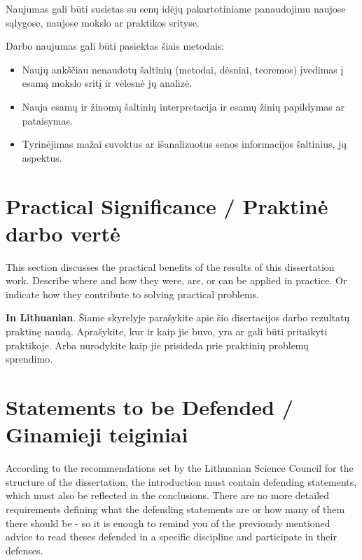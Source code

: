Naujumas gali būti susietas su senų idėjų pakartotiniame panaudojimu naujose sąlygose, naujose mokslo ar praktikos srityse.

Darbo naujumas gali būti pasiektas šiais metodais:
\begin{itemize}
    \item Naujų ankščiau nenaudotų šaltinių (metodai, dėsniai, teoremos) įvedimas į esamą mokslo sritį ir vėlesnė jų analizė.
    \item Nauja esamų ir žinomų šaltinių interpretacija ir esamų žinių papildymas ar pataisymas.
    \item Tyrinėjimas mažai suvoktus ar išanalizuotus senos informacijos šaltinius, jų aspektus.
\end{itemize}



\section*{Practical Significance / Praktinė darbo vertė}  %

This section discusses the practical benefits of the results of this dissertation work. Describe where and how they were, are, or can be applied in practice. Or indicate how they contribute to solving practical problems.

\textbf{In Lithuanian}. 
Šiame skyrelyje parašykite apie šio disertacijos darbo rezultatų praktinę naudą. Aprašykite, kur ir kaip jie buvo, yra ar gali būti pritaikyti praktikoje. Arba nurodykite kaip jie prisideda prie praktinių problemų sprendimo.

\section*{Statements to be Defended / Ginamieji teiginiai}

According to the recommendations set by the Lithuanian Science Council for the structure of the dissertation, the introduction must contain defending statements, which must also be reflected in the conclusions.
There are no more detailed requirements defining what the defending statements are or how many of them there should be - so it is enough to remind you of the previously mentioned advice to read theses defended in a specific discipline and participate in their defenses.

